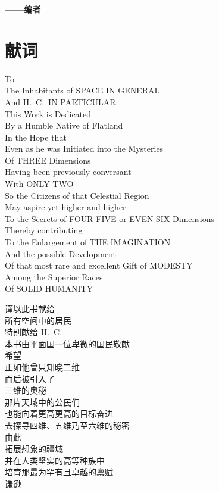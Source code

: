 \documentclass[12pt,UTF8]{ctexbook}
\begin{document}
\begin{flushright}
\textbf{——编者}
\end{flushright}

\chapter*{献词}

To \\
The Inhabitants of SPACE IN GENERAL \\
And H.\ C.\ IN PARTICULAR \\
This Work is Dedicated \\
By a Humble Native of Flatland \\
In the Hope that \\
Even as he was Initiated into the Mysteries \\
Of THREE Dimensions \\
Having been previously conversant \\
With ONLY TWO \\
So the Citizens of that Celestial Region \\
May aspire yet higher and higher \\
To the Secrets of FOUR FIVE or EVEN SIX Dimensions \\
Thereby contributing \\
To the Enlargement of THE IMAGINATION \\
And the possible Development \\
Of that most rare and excellent Gift of MODESTY \\
Among the Superior Races \\
Of SOLID HUMANITY

\bigskip

谨以此书献给 \\
所有空间中的居民 \\
特别献给 H.\ C. \\
本书由平面国一位卑微的国民敬献 \\
希望 \\
正如他曾只知晓二维 \\
而后被引入了 \\
三维的奥秘 \\
那片天域中的公民们 \\
也能向着更高更高的目标奋进 \\
去探寻四维、五维乃至六维的秘密 \\
由此 \\
拓展想象的疆域 \\
并在人类坚实的高等种族中 \\
培育那最为罕有且卓越的禀赋——\\
谦逊
\end{document}

